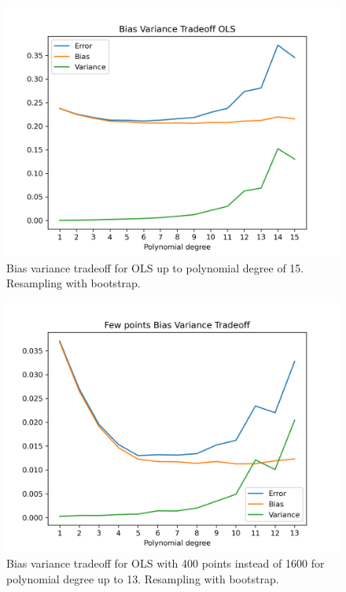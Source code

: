 \documentclass{article}
\begin{document}
\begin{figure}[htbp]
    \centering
    \includegraphics[width=\textwidth*2/3]{Project1/figures/Franke/Bias_Variance_Tradeoff_OLS_15.png}
    \caption{Bias variance tradeoff for OLS up to polynomial degree of 15. Resampling with bootstrap.}
    \label{fig:BVtradeoff}
\end{figure}

\begin{figure}[htbp]
    \centering
    \includegraphics[width=\textwidth*2/3]{Project1/figures/Franke/Few_points_Bias_Variance_Tradeoff_13.png}
    \caption{Bias variance tradeoff for OLS with 400 points instead of 1600 for polynomial degree up to 13. Resampling with bootstrap.}
    \label{fig:FewBVtradeoff}
\end{figure}
\end{document}
